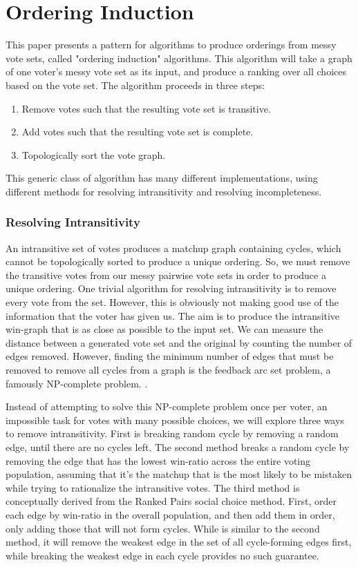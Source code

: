 \documentclass[letterpaper]{article} %
\begin{document}
\section{Ordering Induction}
This paper presents a pattern for algorithms to produce orderings from messy vote sets, called "ordering induction" algorithms. This algorithm will take a graph of one voter's messy vote set as its input, and produce a ranking over all choices based on the vote set. The algorithm proceeds in three steps:

\begin{enumerate}
\item Remove votes such that the resulting vote set is transitive.
\item Add votes such that the resulting vote set is complete.
\item Topologically sort the vote graph.
\end{enumerate}

This generic class of algorithm has many different implementations, using different methods for resolving intransitivity and resolving incompleteness.

\subsubsection{Resolving Intransitivity}
An intransitive set of votes produces a matchup graph containing cycles, which cannot be topologically sorted to produce a unique ordering. So, we must remove the transitive votes from our messy pairwise vote sets in order to produce a unique ordering. One trivial algorithm for resolving intransitivity is to remove every vote from the set. However, this is obviously not making good use of the information that the voter has given us. The aim is to produce the intransitive win-graph that is as close as possible to the input set. We can measure the distance between a generated vote set and the original by counting the number of edges removed. However, finding the minimum number of edges that must be removed to remove all cycles from a graph is the feedback arc set problem, a famously NP-complete problem. \cite{Karp1972}. 

Instead of attempting to solve this NP-complete problem once per voter, an impossible task for votes with many possible choices, we will explore three ways to remove intransitivity. First is breaking random cycle by removing a random edge, until there are no cycles left. The second method breaks a random cycle by removing the edge that has the lowest win-ratio across the entire voting population, assuming that it's the matchup that is the most likely to be mistaken while trying to rationalize the intransitive votes. The third method is conceptually derived from the Ranked Pairs social choice method. First, order each edge by win-ratio in the overall population, and then add them in order, only adding those that will not form cycles. While is similar to the second method, it will remove the weakest edge in the set of all cycle-forming edges first, while breaking the weakest edge in each cycle provides no such guarantee.
\end{document}
